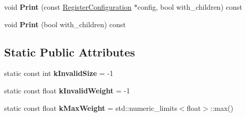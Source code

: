 \begin{DoxyCompactItemize}
\item 
void {\bfseries Print} (const \hyperlink{classv8_1_1internal_1_1_register_configuration}{Register\+Configuration} $\ast$config, bool with\+\_\+children) const \hypertarget{classv8_1_1internal_1_1compiler_1_1_live_range_aa9014c30f6f0fea89641f3c98aa56bee}{}\label{classv8_1_1internal_1_1compiler_1_1_live_range_aa9014c30f6f0fea89641f3c98aa56bee}

\item 
void {\bfseries Print} (bool with\+\_\+children) const \hypertarget{classv8_1_1internal_1_1compiler_1_1_live_range_ab92058994d0f738dc92c0a4e7f74a7bf}{}\label{classv8_1_1internal_1_1compiler_1_1_live_range_ab92058994d0f738dc92c0a4e7f74a7bf}

\end{DoxyCompactItemize}
\subsection*{Static Public Attributes}
\begin{DoxyCompactItemize}
\item 
static const int {\bfseries k\+Invalid\+Size} = -\/1\hypertarget{classv8_1_1internal_1_1compiler_1_1_live_range_aa4b6353611b669dffa4e98bfcc4c721b}{}\label{classv8_1_1internal_1_1compiler_1_1_live_range_aa4b6353611b669dffa4e98bfcc4c721b}

\item 
static const float {\bfseries k\+Invalid\+Weight} = -\/1\hypertarget{classv8_1_1internal_1_1compiler_1_1_live_range_a28410390e22bb5e898b60039da448d5f}{}\label{classv8_1_1internal_1_1compiler_1_1_live_range_a28410390e22bb5e898b60039da448d5f}

\item 
static const float {\bfseries k\+Max\+Weight} = std\+::numeric\+\_\+limits$<$float$>$\+::max()\hypertarget{classv8_1_1internal_1_1compiler_1_1_live_range_aaa51f1336523de820817a35f11aafc04}{}\label{classv8_1_1internal_1_1compiler_1_1_live_range_aaa51f1336523de820817a35f11aafc04}

\end{DoxyCompactItemize}
